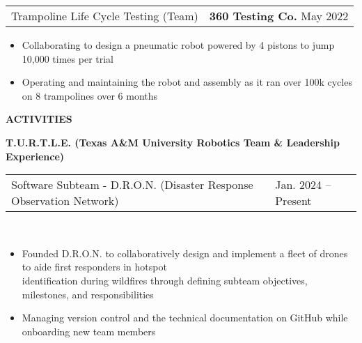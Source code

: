 \documentclass[18pt]{article}
\begin{document}
\vspace{-0.5\baselineskip}
\begin{tabular}{p{} p{} }
    Trampoline Life Cycle Testing (Team) 
    &
    \textbf{360 Testing Co.} \hfill May 2022
\end{tabular}

\vspace{-0.5\baselineskip}
\begin{itemize}[noitemsep]
    
    \item Collaborating to design a pneumatic robot powered by 4 pistons to jump 10,000 times per trial
    \item Operating and maintaining the robot and assembly as it ran over 100k cycles on 8 trampolines over 6 months
\end{itemize}


\vspace{-1.25\baselineskip}
\begin{center}
    \textbf{ACTIVITIES}
    \hrulefill
\end{center}
\vspace{-0.5\baselineskip}

\textbf{T.U.R.T.L.E. (Texas A\&M University Robotics Team \& Leadership Experience)}

\begin{tabular}{p{} p{} }
    Software Subteam - D.R.O.N. (Disaster Response Observation Network)
    &\hfill Jan. 2024 – Present
\end{tabular}\\


\vspace{-0.75\baselineskip}
\begin{itemize}[noitemsep]
  \vspace{-\baselineskip}
  \item Founded D.R.O.N. to collaboratively design and implement a fleet of drones to aide first responders in hotspot\\ identification during wildfires through defining subteam objectives, milestones, and responsibilities
  \item Managing version control and the technical documentation on GitHub while onboarding new team members 
  
\end{itemize}

\vspace{-0.5\baselineskip}
\end{document}
